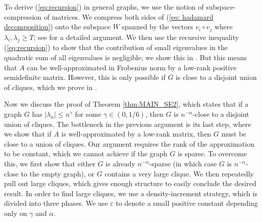 \documentclass[11pt]{article}
\theoremstyle{plain}
\theoremstyle{definition}
\newcommand{\eps}{\varepsilon}
\begin{document}
To derive (\ref{eq:recursion}) in general graphs, we use the notion of subspace-compression of matrices. We compress both sides of (\ref{eq: hadamard decomposition}) onto the subspace $W$ spanned by the vectors $v_i\circ v_j$ where $\lambda_i,\lambda_j \ge T$; see  for a detailed argument. We then use the recursive inequality (\ref{eq:recursion}) to show that the contribution of small eigenvalues in the quadratic sum of all eigenvalues is negligible; we show this in . But this means that $A$ can be well-approximated in Frobenius norm by a low-rank positive semidefinite matrix. However, this is only possible if $G$ is close to a disjoint union of cliques, which we prove in .

\medskip

\noindent
Now we discuss the proof of Theorem \ref{thm:MAIN_SE2}, which states that if a graph $G$ has $|\lambda_n|\leq n^{\gamma}$ for some $\gamma\in (0, 1/6)$, then $G$ is $n^{-\alpha}$-close to a disjoint union of cliques. The bottleneck in the previous argument is its last step, where we show that if $A$ is well-approximated by a low-rank matrix, then $G$ must be close to a union of cliques. Our argument requires the rank of the approximation to be constant, which we cannot achieve if the graph $G$ is sparse. To overcome this, we first show that either $G$ is already $n^{-\alpha}$-sparse (in which case $G$ is $n^{-\alpha}$-close to the empty graph), or $G$ contains a very large clique.  We then repeatedly pull out large cliques, which gives enough structure to easily conclude the desired result. In order to find large cliques, we use a density-increment strategy, which is divided into three phases. We use $\eps$ to denote a small positive constant depending only on $\gamma$ and $\alpha$.
\end{document}

